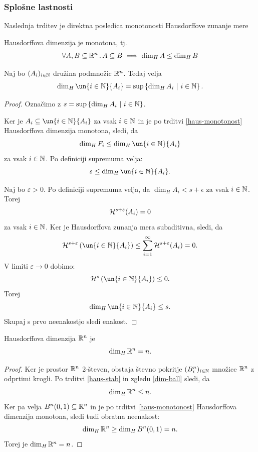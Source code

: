 \subsubsection{Splošne lastnosti}
Naslednja trditev je direktna posledica monotonosti Hausdorffove zunanje mere 

\begin{trditev}[Monotonost]
    \label{haus-monotonost}
    Hausdorffova dimenzija je monotona, tj.
    \[\forall A, B \subseteq \mathbb{R}^n \,.\, A \subseteq B \implies \dim_H A \leq \dim_H B\]
\end{trditev}

\begin{trditev}
    \label{haus-stab}
    Naj bo \((A_i)_{i \in \mathbb{N}}\) družina podmnožic \(\mathbb{R}^n\). Tedaj velja 
    \[\dim_H \un{i \in \N}{A_i} = \sup \setb{\dim_H A_i}{i \in \N}.\]
\end{trditev}

\begin{proof}
    Označimo z \(s = \sup \left\{\dim_H A_i \ | \ i \in \mathbb{N}\right\}\). 
    
    Ker je \(A_i \subseteq \un{i \in \N}{A_i}\) za vsak \(i \in \mathbb{N}\) in je po trditvi \ref{haus-monotonost} Hausdorffova dimenzija monotona, sledi, da
    \[\dim_H F_i \leq \dim_H \un{i \in \N}{A_i}\]
    za vsak \(i \in \mathbb{N}\). Po definiciji supremuma velja:
    \[s \leq \dim_H \un{i \in \N}{A_i}.\]

    Naj bo \(\varepsilon > 0\). Po definiciji supremuma velja, da \(\dim_H A_i < s + \epsilon\) za vsak \(i \in \mathbb{N}\). Torej 
    \[\mathcal{H}^{s + \varepsilon}(A_i) = 0\]
    za vsak \(i \in \mathbb{N}\). Ker je Hausdorffova zunanja mera subaditivna, sledi, da
    \[\mc{H}^{s + \varepsilon}\left(\un{i \in \N}{A_i}\right) \leq \sum_{i=1}^{\infty} \mc{H}^{s + \varepsilon} (A_i) = 0.\]
    V limiti \(\varepsilon \to 0\) dobimo:
    \[\mc{H}^s\left(\un{i \in \N}{A_i}\right) \leq 0.\]
    Torej 
    \[\dim_H \un{i \in \N}{A_i} \leq s.\]    
    Skupaj s prvo neenakostjo sledi enakost.
\end{proof}

\begin{posledica}
    \label{dim-rn}
    Hausdorffova dimenzija \(\mathbb{R}^n\) je 
    \[\dim_H \mathbb{R}^n = n.\]
\end{posledica}

\begin{proof}
    Ker je prostor \(\mathbb{R}^n\) 2-števen, obstaja števno pokritje \((B^n_i)_{i \in \mathbb{N}}\) množice \(\mathbb{R}^n\) z odprtimi krogli. Po trditvi \ref{haus-stab} in zgledu \ref{dim-ball} sledi, da
    \[\dim_H \mathbb{R}^n \leq n.\]
    Ker pa velja \(B^n(0, 1) \subseteq \mathbb{R}^n\) in je po trditvi \ref{haus-monotonost} Hausdorffova dimenzija monotona, sledi tudi obratna neenakost:
    \[
        \dim_H \mathbb{R}^n \geq \dim_H B^n(0, 1) = n.
    \]
    Torej je \(\dim_H \mathbb{R}^n = n\).
\end{proof}

